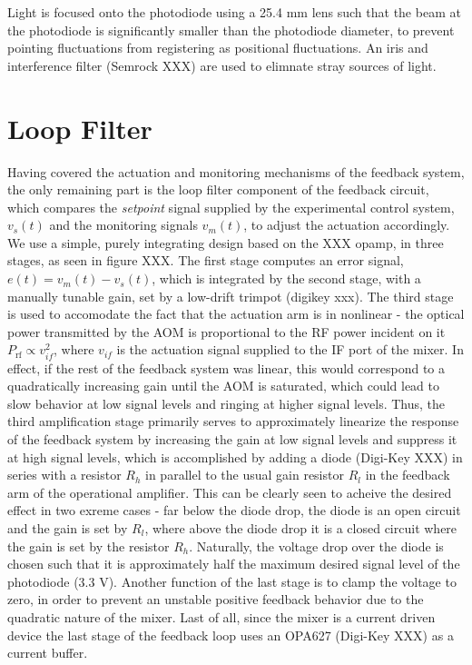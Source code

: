 \documentclass[twocolumn,aps,pra,showpacs,preprintnumbers,bibnotes]{revtex4-1}
\begin{document}
Light is focused onto the photodiode using a 25.4 mm lens such that the beam at the photodiode is significantly smaller than the photodiode diameter, to prevent pointing fluctuations from registering as positional fluctuations. 
An iris and interference filter (Semrock XXX) are used to elimnate stray sources of light. 

\section{Loop Filter}
Having covered the actuation and monitoring mechanisms of the feedback system, the only remaining part is the loop filter component of the feedback circuit, which compares the \textit{setpoint} signal supplied by the experimental control system, $v_s(t)$ and the monitoring signals $v_m(t)$, to adjust the actuation accordingly.
We use a simple, purely integrating design based on the XXX opamp, in three stages, as seen in figure XXX.
The first stage computes an error signal, $e(t)=v_m(t)-v_s(t)$, which is integrated by the second stage, with a manually tunable gain, set by a low-drift trimpot (digikey xxx). 
The third stage is used to accomodate the fact that the actuation arm is in nonlinear - the optical power transmitted by the AOM is proportional to the RF power incident on it $P_{\mathrm{rf}}\propto v_{if}^2$, where $v_{if}$ is the actuation signal supplied to the IF port of the mixer.
In effect, if the rest of the feedback system was linear, this would correspond to a quadratically increasing gain until the AOM is saturated, which could lead to slow behavior at low signal levels and ringing at higher signal levels.
Thus, the third amplification stage primarily serves to approximately linearize the response of the feedback system by increasing the gain at low signal levels and suppress it at high signal levels, which is accomplished by adding a diode (Digi-Key XXX) in series with a resistor $R_h$ in parallel to the usual gain resistor $R_l$ in the feedback arm of the operational amplifier. 
This can be clearly seen to acheive the desired effect in two exreme cases - far below the diode drop, the diode is an open circuit and the gain is set by $R_l$, where above the diode drop it is a closed circuit where the gain is set by the resistor $R_h$.
Naturally, the voltage drop over the diode is chosen such that it is approximately half the maximum desired signal level of the photodiode (3.3 V).
Another function of the last stage is to clamp the voltage to zero, in order to prevent an unstable positive feedback behavior due to the quadratic nature of the mixer.
Last of all, since the mixer is a current driven device the last stage of the feedback loop uses an OPA627 (Digi-Key XXX) as a current buffer. 
\end{document}
